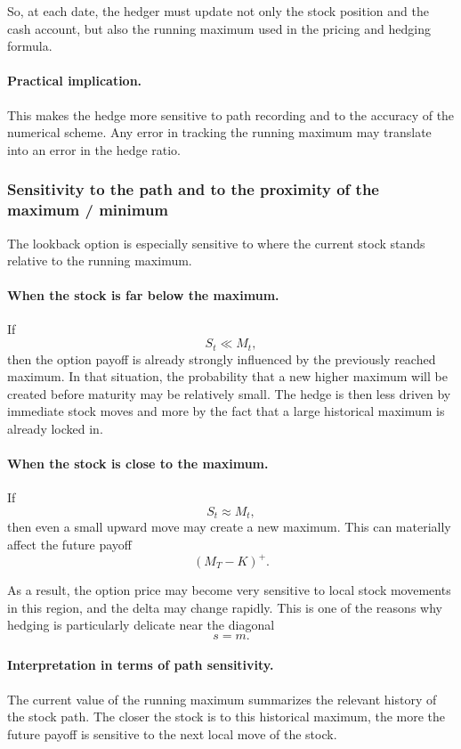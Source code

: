 \documentclass[11pt]{article}
\theoremstyle{plain}
\theoremstyle{definition}
\theoremstyle{remark}
\begin{document}
So, at each date, the hedger must update not only the stock position and
the cash account, but also the running maximum used in the pricing and
hedging formula.

\paragraph{Practical implication.}
This makes the hedge more sensitive to path recording and to the
accuracy of the numerical scheme.
Any error in tracking the running maximum may translate into an error in
the hedge ratio.

\subsubsection{Sensitivity to the path and to the proximity of the maximum / minimum}

The lookback option is especially sensitive to where the current stock
stands relative to the running maximum.

\paragraph{When the stock is far below the maximum.}
If
\[
S_t\ll M_t,
\]
then the option payoff is already strongly influenced by the previously
reached maximum.
In that situation, the probability that a new higher maximum will be
created before maturity may be relatively small.
The hedge is then less driven by immediate stock moves and more by the
fact that a large historical maximum is already locked in.

\paragraph{When the stock is close to the maximum.}
If
\[
S_t\approx M_t,
\]
then even a small upward move may create a new maximum.
This can materially affect the future payoff
\[
(M_T-K)^+.
\]

As a result, the option price may become very sensitive to local stock
movements in this region, and the delta may change rapidly.
This is one of the reasons why hedging is particularly delicate near the
diagonal
\[
s=m.
\]

\paragraph{Interpretation in terms of path sensitivity.}
The current value of the running maximum summarizes the relevant history
of the stock path.
The closer the stock is to this historical maximum, the more the future
payoff is sensitive to the next local move of the stock.
\end{document}
